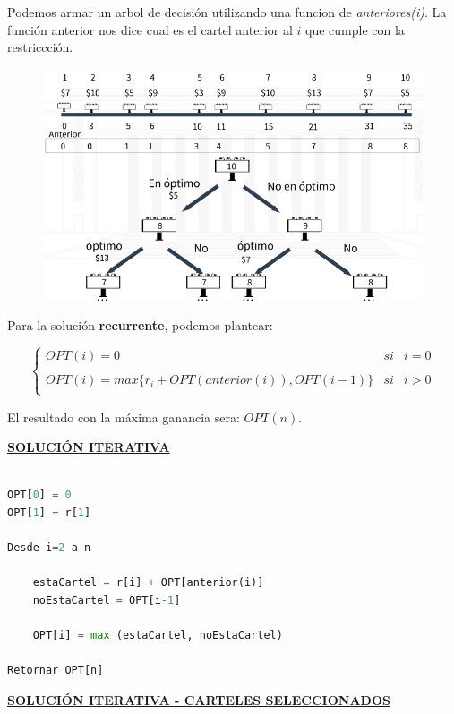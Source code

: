 \documentclass{article}
\begin{document}
Podemos armar un arbol de decisión utilizando una funcion de \textit{anteriores(i)}. La función anterior
nos dice cual es el cartel anterior al \(i\) que cumple con la restriccción.

\begin{figure}[h!]
    \includegraphics[scale=0.4]{imagenes/dinamico-ruta-arbol.png}
\end{figure}


Para la solución \textbf{recurrente}, podemos plantear:

\[
    \left\{ \begin{array}{lcc}
        OPT(i) = 0 &   si  & i = 0 \\
        \\ OPT(i) = max\{r_i + OPT(anterior(i)), OPT(i-1) \} &  si & i > 0 \\
        \end{array}
    \right.
\]

El resultado con la máxima ganancia sera: \(OPT(n)\). 

\noindent
\textbf{\underline{SOLUCIÓN ITERATIVA}}

\begin{lstlisting}[language=Python, caption=Solución iterativa]

OPT[0] = 0
OPT[1] = r[1]

Desde i=2 a n

    estaCartel = r[i] + OPT[anterior(i)]
    noEstaCartel = OPT[i-1]

    OPT[i] = max (estaCartel, noEstaCartel)

Retornar OPT[n]
\end{lstlisting}


\noindent
\textbf{\underline{SOLUCIÓN ITERATIVA - CARTELES SELECCIONADOS}}
\end{document}
